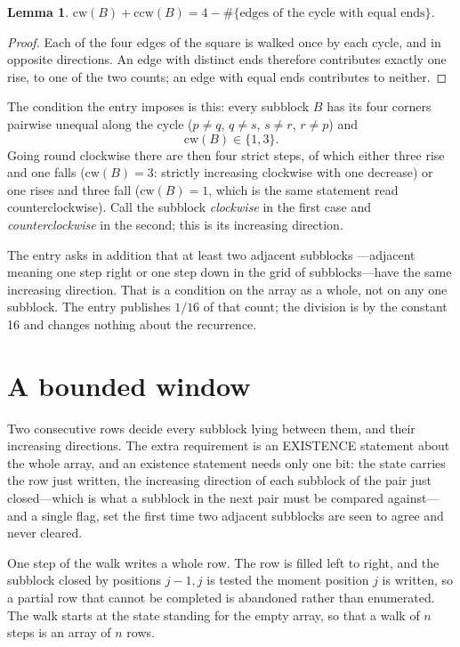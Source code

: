 \documentclass[11pt,a4paper]{article}
\theoremstyle{plain}
\newtheorem{lemma}[theorem]{Lemma}
\theoremstyle{definition}
\begin{document}
\begin{lemma}\label{lem:sum}
$\mathrm{cw}(B)+\mathrm{ccw}(B)=4-\#\{\text{edges of the cycle with equal ends}\}$.
\end{lemma}

\begin{proof}
Each of the four edges of the square is walked once by each cycle, and in opposite directions.
An edge with distinct ends therefore contributes exactly one rise, to one of the two counts;
an edge with equal ends contributes to neither.
\end{proof}

The condition the entry imposes is this: every subblock $B$ has its four corners pairwise unequal along the cycle ($p\ne q$, $q\ne s$, $s\ne r$, $r\ne p$) and
\[
\mathrm{cw}(B)\in\{1,3\}.
\]
Going round clockwise there are then four strict steps, of which either three rise and one falls ($\mathrm{cw}(B)=3$: strictly increasing clockwise with one decrease) or one rises and three fall ($\mathrm{cw}(B)=1$, which is the same statement read counterclockwise). Call the subblock \emph{clockwise} in the first case and \emph{counterclockwise} in the second; this is its increasing direction.

The entry asks in addition that at least two adjacent subblocks ---adjacent meaning one step right or one step down in the grid of subblocks---have the same increasing direction. That is a condition on the array as a whole, not on any one subblock. The entry publishes $1/16$ of that count; the division is by the constant 16 and changes nothing about the recurrence.

\section{A bounded window}

Two consecutive rows decide every subblock lying between them, and their increasing directions. The extra requirement is an EXISTENCE statement about the whole array, and an existence statement needs only one bit: the state carries the row just written, the increasing direction of each subblock of the pair just closed---which is what a subblock in the next pair must be compared against---and a single flag, set the first time two adjacent subblocks are seen to agree and never cleared.

One step of the walk writes a whole row. The row is filled left to right, and the subblock
closed by positions $j-1,j$ is tested the moment position $j$ is written, so a partial row that
cannot be completed is abandoned rather than enumerated. The walk starts at the state standing
for the empty array, so that a walk of $n$ steps is an array of $n$ rows.
\end{document}

